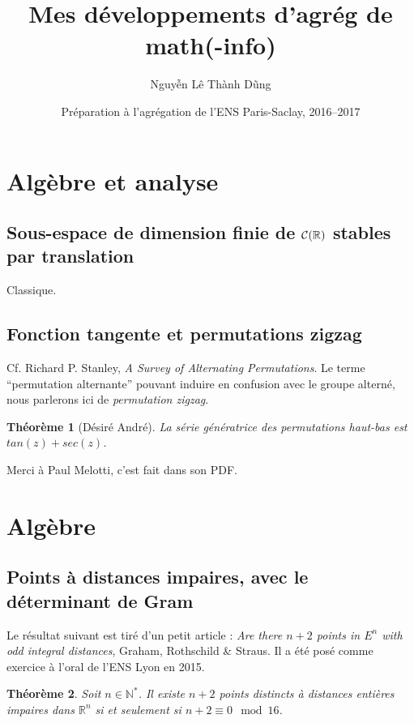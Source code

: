 \documentclass[a4paper, 11pt]{article}
\def\N{\mathbb{N}}
\def\R{\mathbb{R}}
\def\Cf{{\cal{C}}}
\newtheorem*{theorem}{Théorème}
\begin{document}
\title{Mes développements d'agrég de math(-info)}
\author{Nguyễn Lê Thành Dũng}
\date{Préparation à l'agrégation de l'ENS Paris-Saclay, 2016--2017}
\maketitle

\tableofcontents

\section{Algèbre et analyse}

\subsection{Sous-espace de dimension finie de $\Cf(\R)$ stables par translation}

Classique.

\subsection{Fonction tangente et permutations zigzag}

Cf. Richard P. Stanley, \emph{A Survey of Alternating Permutations}. Le terme
\enquote{permutation alternante} pouvant induire en confusion avec le groupe
alterné, nous parlerons ici de \emph{permutation zigzag}.

\begin{theorem}[Désiré André]
La série génératrice des permutations haut-bas est $tan(z)+sec(z)$.
\end{theorem}

Merci à Paul Melotti, c'est fait dans son PDF.


\section{Algèbre}

\subsection{Points à distances impaires, avec le déterminant de Gram}

Le résultat suivant est tiré d'un petit article : \emph{Are there $n+2$ points
  in $E^n$ with odd integral distances}, Graham, Rothschild \& Straus. Il a été
posé comme exercice à l'oral de l'ENS Lyon en 2015.
\begin{theorem}
  Soit $n \in \N^*$. Il existe $n+2$ points distincts à distances entières
  impaires dans $\R^n$ si et seulement si $n+2 \equiv 0 \mod 16$.
\end{theorem}
\end{document}
